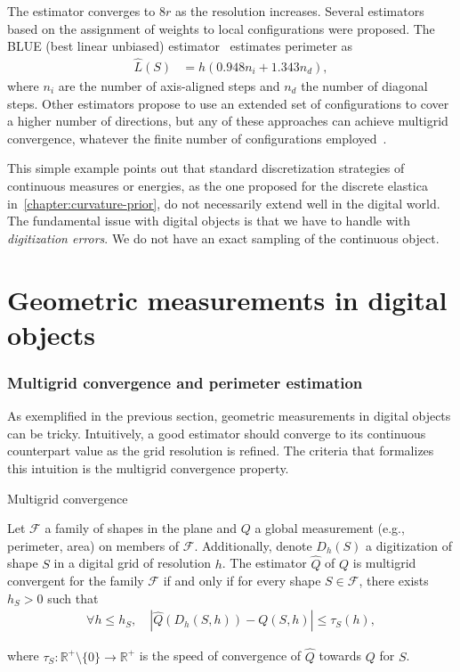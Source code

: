The estimator converges to $8r$ as the resolution increases. %
Several estimators based on the assignment of weights to local configurations were proposed. The BLUE (best linear unbiased) estimator~\cite{dorst87length} estimates perimeter as 
\begin{align*}
	\hat{L}(S) &= h( 0.948 n_i + 1.343 n_d),
\end{align*}
where $n_i$ are the number of axis-aligned steps and $n_d$ the number of diagonal steps. Other estimators propose to use an extended set of configurations to cover a higher number of directions, but any of these approaches can achieve multigrid convergence, whatever the finite number of configurations employed~\cite{tajine03local}.

This simple example points out that standard discretization strategies of continuous measures or energies, as the one proposed for the discrete elastica in~\cref{chapter:curvature-prior}, do not necessarily extend well in the digital world. The fundamental issue with digital objects is that we have to handle with \emph{digitization errors}. We do not have an exact sampling of the continuous object.

\section{Geometric measurements in digital objects}\label{ch4:sec:geometric-measurements}

\subsubsection{Multigrid convergence and perimeter estimation}

As exemplified in the previous section, geometric measurements in digital objects can be tricky. Intuitively, a good estimator should converge to its continuous counterpart value as the grid resolution is refined. The criteria that formalizes this intuition is the multigrid convergence property.

\begin{definition}{Multigrid convergence}

Let $\mathcal{F}$ a family of shapes in the plane and $Q$ a global measurement (e.g., perimeter, area) on members of $\mathcal{F}$. Additionally, denote $D_h(S)$ a digitization of shape $S$ in a digital grid of resolution $h$. The estimator $\hat{Q}$ of $Q$ is multigrid convergent for the family $\mathcal{F}$ if and only if for every shape $S \in \mathcal{F}$, there exists $h_S > 0$ such that
\begin{align*}
\forall h \leq h_S, \quad |\hat{Q}(D_h(S,h)) - Q(S,h)| \leq \tau_S(h),
\end{align*}

where $\tau_S:\mathbb{R}^+\setminus \{0\} \rightarrow \mathbb{R}^+$ is the speed of convergence of $\hat{Q}$ towards $Q$ for $S$.

\end{definition}

